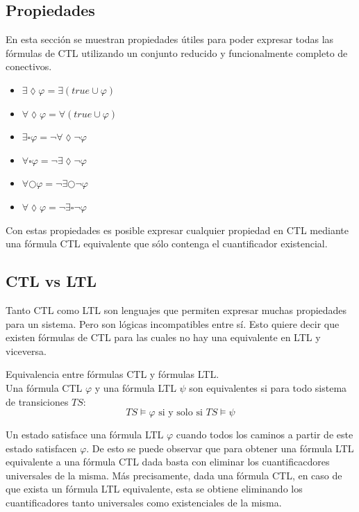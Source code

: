 \subsection{Propiedades}
En esta sección se muestran propiedades útiles para poder expresar todas las fórmulas
 de CTL utilizando un conjunto reducido y funcionalmente completo de conectivos.

\begin{itemize}
\item $\exists \lozenge \varphi = \exists (true \cup \varphi) $
\item $\forall \lozenge \varphi = \forall (true \cup \varphi) $
\item $\exists \square \varphi = \lnot \forall \lozenge \lnot \varphi $
\item $\forall \square \varphi = \lnot \exists \lozenge \lnot \varphi $
\item $\forall \bigcirc \varphi = \lnot \exists \bigcirc \lnot \varphi $
\item $\forall \lozenge \varphi = \lnot \exists \square \lnot \varphi $
\end{itemize}

Con estas propiedades es posible expresar cualquier propiedad en CTL mediante
 una fórmula CTL equivalente que sólo contenga el cuantificador existencial.


\subsection{CTL vs LTL}
Tanto CTL como LTL son lenguajes que permiten expresar muchas propiedades para un sistema.
 Pero son lógicas incompatibles entre sí. Esto quiere decir que existen fórmulas de CTL
 para las cuales no hay una equivalente en LTL y viceversa.

\begin{definicion}
Equivalencia entre fórmulas CTL y fórmulas LTL.\\
Una fórmula CTL $\varphi$ y una fórmula LTL $\psi$ son equivalentes si para todo
 sistema de transiciones $TS$:
\[ TS \models \varphi \text{ si y solo si } TS \models \psi \]
\end{definicion}

Un estado satisface una fórmula LTL $\varphi$ cuando todos los caminos a partir de
 este estado satisfacen $\varphi$.
De esto se puede observar que para obtener una fórmula LTL equivalente a una
 fórmula CTL dada basta con eliminar los cuantificacdores universales de la misma.
Más precisamente, dada una fórmula CTL, en caso de que exista un fórmula LTL
 equivalente, esta se obtiene eliminando los cuantificadores tanto universales
 como existenciales de la misma.
 